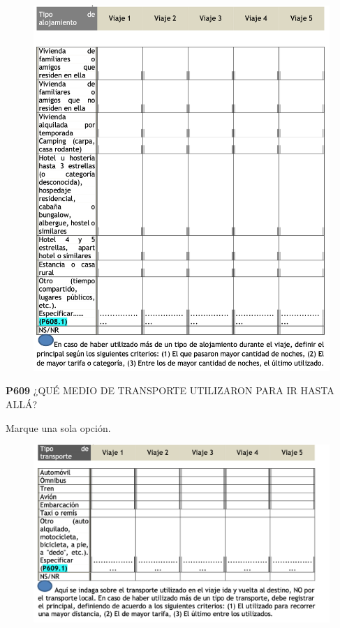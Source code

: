 \documentclass[
  openany]{book}
\begin{document}
\begin{figure}

{\centering \includegraphics[width=1\linewidth]{imagenes/figura6-215} 

}

\end{figure}

\textbf{P609} ¿QUÉ MEDIO DE TRANSPORTE UTILIZARON PARA IR HASTA ALLÁ?

Marque una sola opción.

\begin{figure}

{\centering \includegraphics[width=1\linewidth]{imagenes/figura6-216} 

}

\end{figure}
\end{document}
